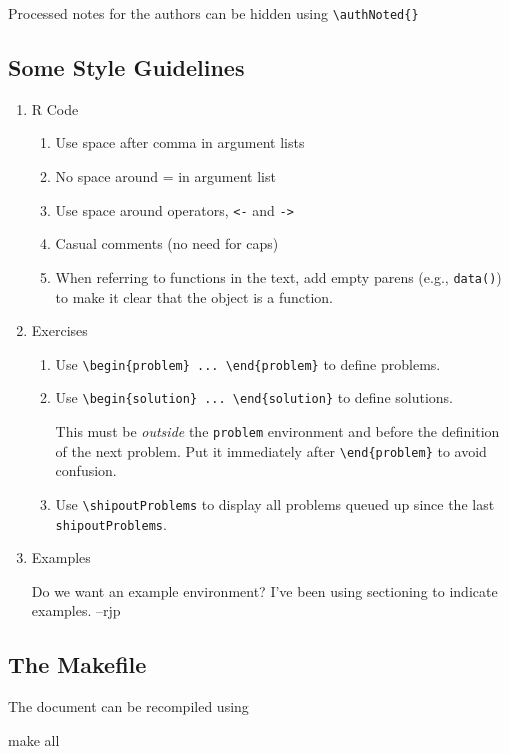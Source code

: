 \documentclass[twoside]{report}
\renewenvironment{Schunk}{\vspace{\topsep}}{\vspace{\topsep}}
\renewenvironment{Schunk}{

\noindent
\begin{graybox}}{\end{graybox}

}
\begin{document}
Processed notes for the authors can be hidden using \verb!\authNoted{}!

\subsection*{Some Style Guidelines}

\begin{enumerate}
\item
R Code
\begin{enumerate}
\item Use space after comma in argument lists 
\item No space around = in argument list
\item Use space around operators, \verb!<-! and \verb!->!
\item Casual comments (no need for caps)
\item When referring to functions in the text, add empty parens
(e.g., \verb!data()!) to make it clear that the object is a function.
\end{enumerate}
\item
Exercises
\begin{enumerate}
\item Use \verb!\begin{problem} ... \end{problem}! to define problems.
\item Use \verb!\begin{solution} ... \end{solution}! to define solutions.

This must be \emph{outside} the \verb!problem! environment and before 
the definition of the next problem.  Put it immediately after 
\verb!\end{problem}! to avoid confusion.

\item
Use \verb!\shipoutProblems! to display all problems queued up since the 
last \verb!shipoutProblems!.

\end{enumerate}

\item Examples

Do we want an example environment?  I've been using 
sectioning to indicate examples. --rjp

\end{enumerate}


\subsection*{The Makefile}
The document can be recompiled using
\begin{Schunk}
\begin{Sinput}
make all
\end{Sinput}
\end{Schunk}
\end{document}
